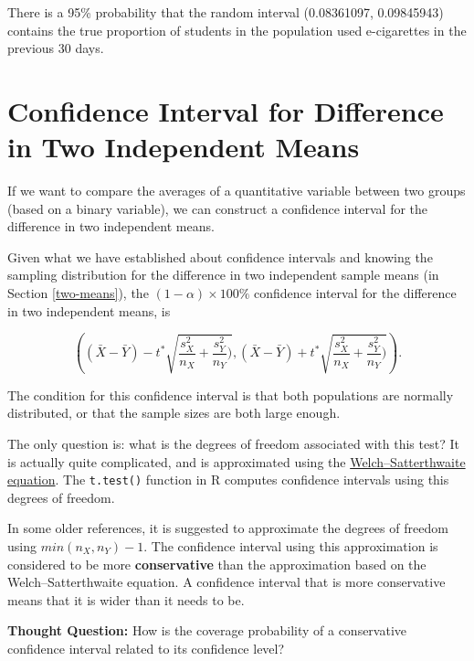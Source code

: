 \documentclass[
]{book}
\theoremstyle{definition}
\theoremstyle{definition}
\theoremstyle{definition}
\theoremstyle{definition}
\theoremstyle{remark}
\begin{document}
There is a 95\% probability that the random interval (0.08361097, 0.09845943) contains the true proportion of students in the population used e-cigarettes in the previous 30 days.

\hypertarget{confidence-interval-for-difference-in-two-independent-means}{%
\section{Confidence Interval for Difference in Two Independent Means}\label{confidence-interval-for-difference-in-two-independent-means}}

If we want to compare the averages of a quantitative variable between two groups (based on a binary variable), we can construct a confidence interval for the difference in two independent means.

Given what we have established about confidence intervals and knowing the sampling distribution for the difference in two independent sample means (in Section \ref{two-means}), the \((1-\alpha) \times 100\%\) confidence interval for the difference in two independent means, is

\begin{equation} 
\left( (\bar{X} - \bar{Y}) - t^{*} \sqrt{\frac{s^2_X}{n_X} + \frac{s^2_Y}{n_Y})}, (\bar{X} - \bar{Y}) + t^{*} \sqrt{\frac{s^2_X}{n_X} + \frac{s^2_Y}{n_Y})} \right).
\label{eq:8-CI2means}
\end{equation}

The condition for this confidence interval is that both populations are normally distributed, or that the sample sizes are both large enough.

The only question is: what is the degrees of freedom associated with this test? It is actually quite complicated, and is approximated using the \href{https://en.wikipedia.org/wiki/Welch\%27s_t-test\#Calculations}{Welch--Satterthwaite equation}. The \texttt{t.test()} function in R computes confidence intervals using this degrees of freedom.

In some older references, it is suggested to approximate the degrees of freedom using \(min(n_X, n_Y) - 1\). The confidence interval using this approximation is considered to be more \textbf{conservative} than the approximation based on the Welch--Satterthwaite equation. A confidence interval that is more conservative means that it is wider than it needs to be.

\textbf{Thought Question:} How is the coverage probability of a conservative confidence interval related to its confidence level?
\end{document}
